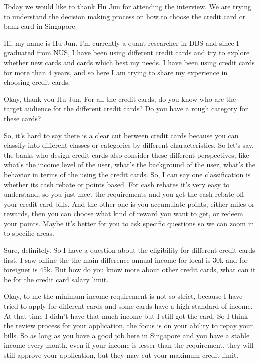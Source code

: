 \begin{description}[leftmargin=4em,style=nextline]
	\item[JH:] Today we would like to thank Hu Jun for attending the interview. We are trying to understand the decision making process on how to choose the credit card or bank card in Singapore.

	\item[HJ:] Hi, my name is Hu Jun. I'm currently a quant researcher in DBS and since I graduated from NUS, I have been using different credit cards and try to explore whether new cards and cards which best my needs. I have been using credit cards for more than 4 years, and so here I am trying to share my experience in choosing credit cards.

	\item[JH:] Okay, thank you Hu Jun. For all the credit cards, do you know who are the target audience for the different credit cards? Do you have a rough category for these cards?

	\item[HJ:] So, it's hard to say there is a clear cut between credit cards because you can classify into different classes or categories by different characteristics. So let’s say, the banks who design credit cards also consider these different perspectives, like what’s the income level of the user, what’s the background of the user, what’s the behavior in terms of the using the credit cards. So, I can say one classification is whether its cash rebate or points based. For cash rebates it's very easy to understand, so you just meet the requirements and you get the cash rebate off your credit card bills. And the other one is you accumulate points, either miles or rewards, then you can choose what kind of reward you want to get, or redeem your points. Maybe it's better for you to ask specific questions so we can zoom in to specific areas.

	\item[JH:] Sure, definitely. So I have a question about the eligibility for different credit cards first. I saw online the the main difference annual income for local is 30k and for foreigner is 45k. But how do you know more about other credit cards, what can it be for the credit card salary limit.

	\item[HJ:] Okay, to me the minimum income requirement is not so strict, because I have tried to apply for different cards and some cards have a high standard of income. At that time I didn’t have that much income but I still got the card. So I think the review process for your application, the focus is on your ability to repay your bills. So as long as you have a good job here in Singapore and you have a stable income every month, even if your income is lesser than the requirement, they will still approve your application, but they may cut your maximum credit limit.


\end{description}

